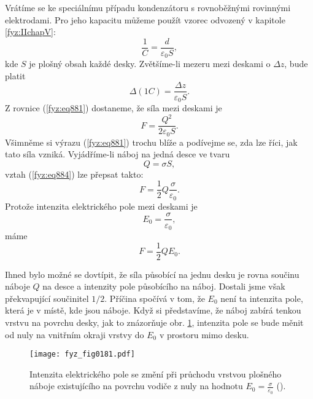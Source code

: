     Vrátíme se ke speciálnímu případu kondenzátoru s rovnoběžnými rovinnými elektrodami. Pro jeho
    kapacitu můžeme použít vzorec odvozený v kapitole \ref{fyz:IIchapV}:
    \begin{equation}\label{fyz:eq883}
      \dfrac{1}{C}=\dfrac{d}{\varepsilon_0S},
    \end{equation}
    kde \(S\) je plošný obsah každé desky. Zvětšíme-li mezeru mezi deskami o \(\Delta z\), bude
    platit
    \begin{equation*}
      Δ\left(1C\right)=\dfrac{Δz}{\varepsilon_0S}.
    \end{equation*}
    Z rovnice (\ref{fyz:eq881}) dostaneme, že síla mezi deskami je
    \begin{equation}\label{fyz:eq884}
      F=\dfrac{Q^2}{2\varepsilon_0S}.
    \end{equation}
    Všimněme si výrazu (\ref{fyz:eq881}) trochu blíže a podívejme se, zda lze říci, jak tato síla
    vzniká. Vyjádříme-li náboj na jedná desce ve tvaru
    \begin{equation*}
      Q=σS,
    \end{equation*}
    vztah (\ref{fyz:eq884}) lze přepsat takto:
    \begin{equation*}
      F=\dfrac{1}{2}Q\dfrac{σ}{\varepsilon_0}.
    \end{equation*}
    Protože intenzita elektrického pole mezi deskami je
    \begin{equation*}
      E_0=\dfrac{σ}{\varepsilon_0},
    \end{equation*}
    máme
    \begin{equation}\label{fyz:eq885}
      F=\dfrac{1}{2}QE_0.
    \end{equation}

    Ihned bylo možné se dovtípit, že síla působící na jednu desku je rovna součinu náboje \(Q\) na
    desce a intenzity pole působícího na náboj. Dostali jsme však překvapující součinitel \(1/2\).
    Příčina spočívá v tom, že \(E_0\) není ta intenzita pole, která je v místě, kde jsou náboje.
    Když si představíme, že náboj zabírá tenkou vrstvu na povrchu desky, jak to znázorňuje obr.
    \ref{fyz:fig0181}, intenzita pole se bude měnit od nuly na vnitřním okraji vrstvy do \(E_0\) v
    prostoru mimo desku.
    
    \begin{figure}[ht!]  %
      \centering
      \texttt{[image: fyz\_fig0181.pdf]}
      \caption{Intenzita elektrického pole se změní při průchodu vrstvou plošného náboje
              existujícího na povrchu vodiče z nuly na hodnotu \(E_0 =
              \frac{\sigma}{\varepsilon_0}\) (\cite[s.~145]{Feynman02}).}
      \label{fyz:fig0181}
    \end{figure}

